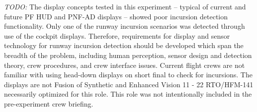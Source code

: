 \documentclass[utf8,bachelor,manualbib]{gradu3}
\begin{document}
\emph{TODO:}
The display concepts tested in this experiment – typical of current and future PF HUD and PNF-AD displays
– showed poor incursion detection functionality. Only one of the runway incursion scenarios was detected
through use of the cockpit displays. Therefore, requirements for display and sensor technology for runway
incursion detection should be developed which span the breadth of the problem, including human perception,
sensor design and detection theory, crew procedures, and crew interface issues. Current flight crews are not
familiar with using head-down displays on short final to check for incursions. The displays are not
Fusion of Synthetic and Enhanced Vision
11 - 22 RTO/HFM-141
necessarily optimized for this role. This role was not intentionally included in the pre-experiment crew
briefing. \citep{baileyym2007}
\end{document}
